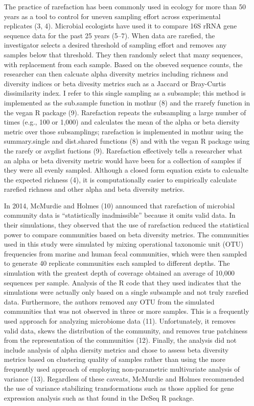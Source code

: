 \documentclass[
]{article}
\begin{document}
The practice of rarefaction has been commonly used in ecology for more
than 50 years as a tool to control for uneven sampling effort across
experimental replicates (3, 4). Microbial ecologists have used it to
compare 16S rRNA gene sequence data for the past 25 years (5--7). When
data are rarefied, the investigator selects a desired threshold of
sampling effort and removes any samples below that threshold. They then
randomly select that many sequences, with replacement from each sample.
Based on the obseved sequence counts, the researcher can then calcuate
alpha diversity metrics including richness and diversity indices or beta
divesity metrics such as a Jaccard or Bray-Curtis dissimilarity index. I
refer to this single sampling as a subsample; this method is implemented
as the sub.sample function in mothur (8) and the rrarefy function in the
vegan R package (9). Rarefaction repeats the subsampling a large number
of times (e.g., 100 or 1,000) and calculates the mean of the alpha or
beta diersity metric over those subsamplings; rarefaction is implemented
in mothur using the summary.single and dist.shared functions (8) and
with the vegan R package using the rarefy or avgdist fuctions (9).
Rarefaction effectively tells a researcher what an alpha or beta
diversity metric would have been for a collection of samples if they
were all evenly sampled. Although a closed form equation exists to
calcualte the expected richness (4), it is computationally easier to
empirically calculate rarefied richness and other alpha and beta
diversity metrics.

In 2014, McMurdie and Holmes (10) announced that rarefaction of
microbial community data is ``statistically inadmissible'' because it
omits valid data. In their simulations, they observed that the use of
rarefaction reduced the statistical power to compare communities based
on beta diversity metrics. The communities used in this study were
simulated by mixing operational taxonomic unit (OTU) frequencies from
marine and human fecal communities, which were then sampled to generate
40 replicate communities each sampled to different depths. The
simulation with the greatest depth of coverage obtained an average of
10,000 sequences per sample. Analysis of the R code that they used
indicates that the simulations were actually only based on a single
subsample and not truly rarefied data. Furthermore, the authors removed
any OTU from the simulated communities that was not observed in three or
more samples. This is a frequently used approach for analyzing
microbiome data (11). Unfortunately, it removes valid data, skews the
distribution of the community, and removes true patchiness from the
representation of the communities (12). Finally, the analysis did not
include analysis of alpha diersity metrics and chose to assess beta
diversity metrics based on clustering quality of samples rather than
using the more frequently used approach of employing non-parametric
multivariate analysis of variance (13). Regardless of these caveats,
McMurdie and Holmes recommended the use of variance stabilizing
transformations such as those applied for gene expression analysis such
as that found in the DeSeq R package.
\end{document}
